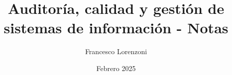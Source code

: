


\title{Auditoría, calidad y gestión de sistemas de información - Notas}
\author{Francesco Lorenzoni}
\date{Febrero 2025}




\lstset{language=Java}


\maketitle
\tableofcontents






